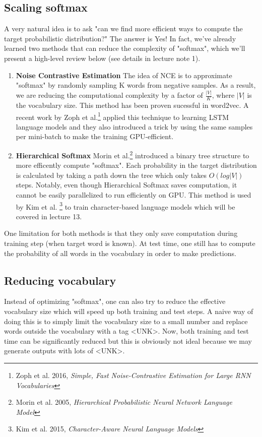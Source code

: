 \documentclass{tufte-handout}
\begin{document}
\subsection{Scaling softmax}
A very natural idea is to ask "can we find more efficient ways to compute the target probabilistic distribution?" The answer is Yes! In fact, we've already learned two methods that can reduce the complexity of "softmax", which we'll present a high-level review below (see details in lecture note 1).
\begin{enumerate}
\item \textbf{Noise Contrastive Estimation}\newline
The idea of NCE is to approximate "softmax" by randomly sampling K words from negative samples. As a result, we are reducing the computational complexity by a factor of $\frac{|V|}{K}$, where $|V|$ is the vocabulary size. This method has been proven sucessful in word2vec. A recent work by Zoph et al.\footnote{Zoph et al. 2016, \textit{Simple, Fast Noise-Contrastive Estimation for Large RNN Vocabularies}} applied this technique to learning LSTM language models and they also introduced a trick by using the same samples per mini-batch to make the training GPU-efficient.

\item \textbf{Hierarchical Softmax} \newline
Morin et al.\footnote{Morin et al. 2005, \textit{Hierarchical Probabilistic Neural Network Language Model}}
introduced a binary tree structure to more efficently compute "softmax". Each probability in the target distribution is calculated by taking a path down the tree which only takes $O(log|V|)$ steps. Notably, even though Hierarchical Softmax saves computation, it cannot be easily parallelized to run efficiently on GPU. This method is used by Kim et al. \footnote{Kim et al. 2015, \textit{Character-Aware Neural Language Models}} to train character-based language models which will be covered in lecture 13. 
\end{enumerate}

One limitation for both methods is that they only save computation during training step (when target word is known). At test time, one still has to compute the probability of all words in the vocabulary in order to make predictions.
\subsection{Reducing vocabulary}
Instead of optimizing "softmax", one can also try to reduce the effective vocabulary size which will speed up both training and test steps. A naive way of doing this is to simply limit the vocabulary size to a small number and replace words outside the vocabulary with a tag <UNK>. Now, both training and test time can be significantly reduced but this is obviously not ideal because we may generate outputs with lots of <UNK>.
\end{document}
